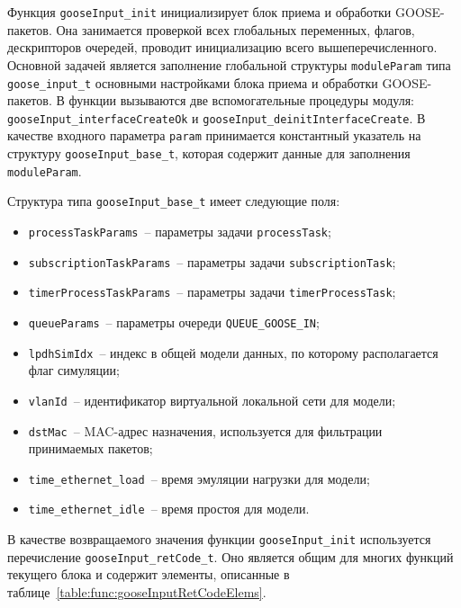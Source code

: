 Функция \lstinline{gooseInput_init} инициализирует блок приема и обработки GOOSE-пакетов. Она занимается проверкой всех глобальных
переменных, флагов, дескрипторов очередей, проводит инициализацию всего вышеперечисленного. Основной задачей является заполнение
глобальной структуры \lstinline{moduleParam} типа \lstinline{goose_input_t} основными настройками блока приема и обработки GOOSE-пакетов. В функции вызываются две
вспомогательные процедуры модуля: \lstinline{gooseInput_interfaceCreateOk} и \lstinline{gooseInput_deinitInterfaceCreate}.
В качестве входного параметра \lstinline{param} принимается
константный указатель на структуру
\lstinline{gooseInput_base_t}, которая содержит данные для заполнения \lstinline{moduleParam}.

Структура типа \lstinline{gooseInput_base_t} имеет следующие поля:

\begin{itemize}
    \item \lstinline{processTaskParams}~-- параметры задачи \lstinline{processTask};
    \item \lstinline{subscriptionTaskParams}~-- параметры задачи \lstinline{subscriptionTask};
    \item \lstinline{timerProcessTaskParams}~-- параметры задачи \lstinline{timerProcessTask};
    \item \lstinline{queueParams}~-- параметры очереди \lstinline{QUEUE_GOOSE_IN};
    \item \lstinline{lpdhSimIdx}~-- индекс в общей модели данных, по которому располагается флаг симуляции;
    \item \lstinline{vlanId}~-- идентификатор виртуальной локальной сети для модели;
    \item \lstinline{dstMac}~-- MAC-адрес назначения, используется для фильтрации принимаемых пакетов;
    \item \lstinline{time_ethernet_load}~-- время эмуляции нагрузки для модели;
    \item \lstinline{time_ethernet_idle}~-- время простоя для модели.
\end{itemize}

В качестве возвращаемого значения функции \lstinline{gooseInput_init}
используется перечисление \lstinline{gooseInput_retCode_t}. Оно является общим
для многих функций текущего блока и содержит элементы, описанные
в таблице~\ref{table:func:gooseInputRetCodeElems}.

